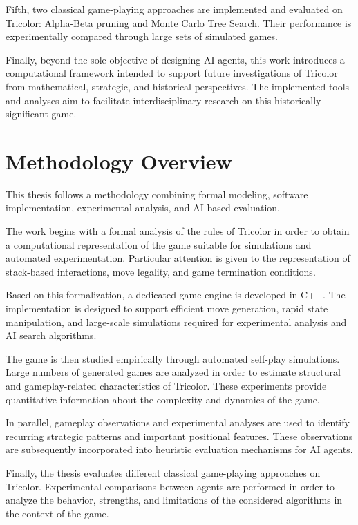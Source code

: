 Fifth, two classical game-playing approaches are implemented and evaluated on Tricolor: Alpha-Beta pruning and Monte Carlo Tree Search. Their performance is experimentally compared through large sets of simulated games.

Finally, beyond the sole objective of designing AI agents, this work introduces a computational framework intended to support future investigations of Tricolor from mathematical, strategic, and historical perspectives. The implemented tools and analyses aim to facilitate interdisciplinary research on this historically significant game.

\section{Methodology Overview}

This thesis follows a methodology combining formal modeling, software implementation, experimental analysis, and AI-based evaluation.

The work begins with a formal analysis of the rules of Tricolor in order to obtain a computational representation of the game suitable for simulations and automated experimentation. Particular attention is given to the representation of stack-based interactions, move legality, and game termination conditions.

Based on this formalization, a dedicated game engine is developed in C++. The implementation is designed to support efficient move generation, rapid state manipulation, and large-scale simulations required for experimental analysis and AI search algorithms.

The game is then studied empirically through automated self-play simulations. Large numbers of generated games are analyzed in order to estimate structural and gameplay-related characteristics of Tricolor. These experiments provide quantitative information about the complexity and dynamics of the game.

In parallel, gameplay observations and experimental analyses are used to identify recurring strategic patterns and important positional features. These observations are subsequently incorporated into heuristic evaluation mechanisms for AI agents.

Finally, the thesis evaluates different classical game-playing approaches on Tricolor. Experimental comparisons between agents are performed in order to analyze the behavior, strengths, and limitations of the considered algorithms in the context of the game.

